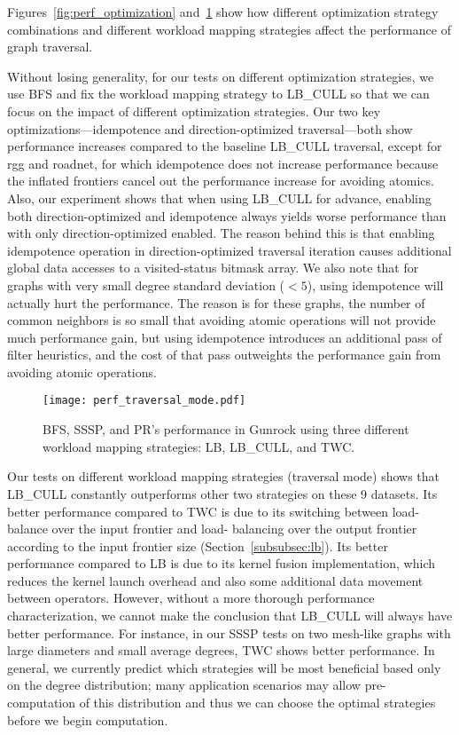 \documentclass[format=acmsmall,review=false,screen=true]{acmart}
\begin{document}
Figures~\ref{fig:perf_optimization} and~\ref{fig:perf_traversal} show
how different optimization strategy combinations and different
workload mapping strategies affect the performance of graph traversal.

Without losing generality, for our tests on different optimization
strategies, we use BFS and fix the workload mapping strategy to
LB\_CULL so that we can focus on the impact of different optimization
strategies. Our two key optimizations---idempotence and
direction-optimized traversal---both show performance increases
compared to the baseline LB\_CULL traversal, except for rgg and
roadnet, for which idempotence does not increase performance because
the inflated frontiers cancel out the performance increase for
avoiding atomics. Also, our experiment shows that when using LB\_CULL
for advance, enabling both direction-optimized and idempotence always
yields worse performance than with only direction-optimized enabled.
The reason behind this is that enabling idempotence operation in
direction-optimized traversal iteration causes additional global data
accesses to a visited-status bitmask array. We also note that for
graphs with very small degree standard deviation ($< 5$), using
idempotence will actually hurt the performance. The reason is for
these graphs, the number of common neighbors is so small that avoiding
atomic operations will not provide much performance gain, but using
idempotence introduces an additional pass of filter heuristics, and
the cost of that pass outweights the performance gain from avoiding
atomic operations.

\begin{figure}
    \centering
    \texttt{[image: perf\_traversal\_mode.pdf]}
    \centering \caption[Impact of different traversal modes on
    Gunrock's performance.]{BFS, SSSP, and PR's performance in Gunrock
      using three different workload mapping strategies: LB, LB\_CULL,
      and TWC\@.\label{fig:perf_traversal}}
\end{figure}

Our tests on different workload mapping strategies (traversal mode)
shows that LB\_CULL constantly outperforms other two strategies on
these 9 datasets. Its better performance compared to TWC is due to its
switching between load-balance over the input frontier and load-
balancing over the output frontier according to the input frontier
size (Section~\ref{subsubsec:lb}). Its better performance compared to
LB is due to its kernel fusion implementation, which reduces the
kernel launch overhead and also some additional data movement between
operators. However, without a more thorough performance
characterization, we cannot make the conclusion that LB\_CULL will
always have better performance. For instance, in our SSSP tests on two
mesh-like graphs with large diameters and small average degrees, TWC
shows better performance. In general, we currently predict which
strategies will be most beneficial based only on the degree
distribution; many application scenarios may allow pre-computation of
this distribution and thus we can choose the optimal strategies before
we begin computation.
\end{document}
